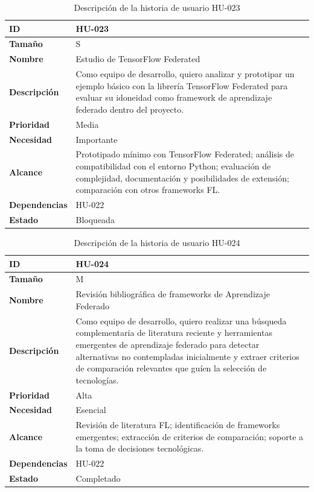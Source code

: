 \documentclass{report}
\begin{document}
\begin{table}[H]
\centering
\caption{Descripción de la historia de usuario HU-023}
\label{tab:hu023}
\begin{tabular}{|l|p{12cm}|}
\hline
\textbf{ID} & HU-023 \\ \hline
\textbf{Tamaño} & S \\ \hline
\textbf{Nombre} & Estudio de TensorFlow Federated \\ \hline
\textbf{Descripción} &
Como equipo de desarrollo, quiero analizar y prototipar un ejemplo básico con la librería TensorFlow Federated para evaluar su idoneidad como framework de aprendizaje federado dentro del proyecto. \\ \hline
\textbf{Prioridad} & Media \\ \hline
\textbf{Necesidad} & Importante \\ \hline
\textbf{Alcance} &
Prototipado mínimo con TensorFlow Federated; análisis de compatibilidad con el entorno Python; evaluación de complejidad, documentación y posibilidades de extensión; comparación con otros frameworks FL. \\ \hline
\textbf{Dependencias} & HU-022 \\ \hline
\textbf{Estado} & Bloqueada \\ \hline
\end{tabular}
\end{table}



\begin{table}[H]
\centering
\caption{Descripción de la historia de usuario HU-024}
\label{tab:hu024}
\begin{tabular}{|l|p{12cm}|}
\hline
\textbf{ID} & HU-024 \\ \hline
\textbf{Tamaño} & M \\ \hline
\textbf{Nombre} & Revisión bibliográfica de frameworks de Aprendizaje Federado \\ \hline
\textbf{Descripción} &
Como equipo de desarrollo, quiero realizar una búsqueda complementaria de literatura reciente y herramientas emergentes de aprendizaje federado para detectar alternativas no contempladas inicialmente y extraer criterios de comparación relevantes que guíen la selección de tecnologías. \\ \hline
\textbf{Prioridad} & Alta \\ \hline
\textbf{Necesidad} & Esencial \\ \hline
\textbf{Alcance} &
Revisión de literatura FL; identificación de frameworks emergentes; extracción de criterios de comparación; soporte a la toma de decisiones tecnológicas. \\ \hline
\textbf{Dependencias} & HU-022 \\ \hline
\textbf{Estado} & Completado \\ \hline
\end{tabular}
\end{table}
\end{document}
